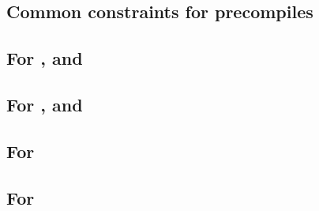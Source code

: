 \subsection{Common constraints for precompiles}                            \label{oob: precompiles: common precompiles: generalities}           \newpage
\subsection{For \oobInstEcrecover{}, \oobInstEcadd{} and \oobInstEcmul{}}  \label{oob: precompiles: common precompiles: one row precompiles}             \newpage
\subsection{For \oobInstShaTwo{}, \oobInstRipemd{} and \oobInstIdentity{}} \label{oob: precompiles: common precompiles: two row precompiles}             \newpage
\subsection{For \oobInstEcpairing{}}                                       \label{oob: precompiles: common precompiles: three row precompiles}           \newpage
\subsection{For \oobInstPVerify{}}                                     \label{oob: precompiles: common precompiles: p256verify}               \newpage
